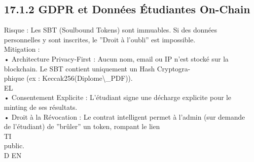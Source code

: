 \documentclass[12pt,landscape,a4paper]{article}
\begin{document}
\subsection{17.1.2 GDPR et Données Étudiantes On-Chain}
Risque : Les SBT (Soulbound Tokens) sont immuables. Si des données personnelles y sont inscrites, le ”Droit à l’oubli” est impossible.\\
Mitigation :\\
\vspace{0.5em}
• Architecture Privacy-First : Aucun nom, email ou IP n’est stocké sur la blockchain. Le SBT contient uniquement un Hash Cryptogra-\\
phique (ex : Keccak256(Diplome\textbackslash{}_PDF)).\\
\vspace{0.5em}
\vspace{0.5em}
\vspace{0.5em}
\vspace{0.5em}
EL\\
• Consentement Explicite : L’étudiant signe une décharge explicite pour le minting de ses résultats.\\
\vspace{0.5em}
• Droit à la Révocation : Le contrat intelligent permet à l’admin (sur demande de l’étudiant) de ”brûler” un token, rompant le lien\\
\vspace{0.5em}
\vspace{0.5em}
\vspace{0.5em}
\vspace{0.5em}
TI\\
public.\\
\vspace{0.5em}
\vspace{0.5em}
\vspace{0.5em}
\vspace{0.5em}
D    EN\\
\end{document}
